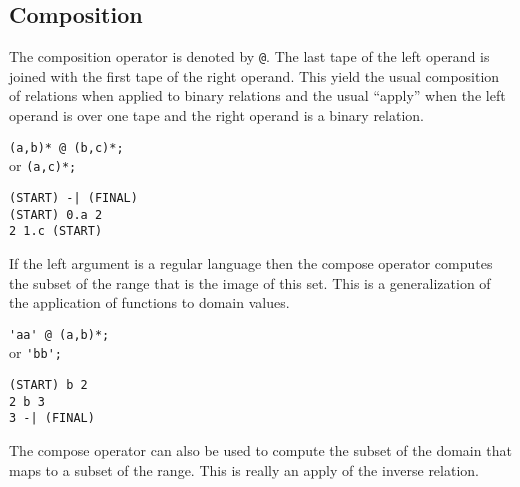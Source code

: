 \subsection{Composition}
The composition operator is denoted by \verb#@#.
The last tape of the left operand is joined with the first tape of the
right operand.
This yield the usual composition of relations when applied to binary
relations and the usual ``apply'' when the left operand is over one tape
and the right operand is a binary relation.
\begin{center}\begin{minipage}[t]{3in}\begin{minipage}[t]{3in}\begin{tabbing}
\qquad \= \verb#(a,b)* @ (b,c)*;#\\
or \> \verb#(a,c)*;#
\end{tabbing}\end{minipage}\end{minipage}
\begin{minipage}[t]{1.6in}\begin{verbatim}
(START) -| (FINAL)
(START) 0.a 2
2 1.c (START)
\end{verbatim}\end{minipage}\end{center}
If the left argument is a regular language then the compose operator
computes the subset of the range that is the image of this set.
This is a generalization of the application of functions to domain values.
\begin{center}\begin{minipage}[t]{3in}\begin{minipage}[t]{3in}\begin{tabbing}
\qquad \= \verb#'aa' @ (a,b)*;#\\
or \> \verb#'bb';#
\end{tabbing}\end{minipage}\end{minipage}
\begin{minipage}[t]{1.6in}\begin{verbatim}
(START) b 2
2 b 3
3 -| (FINAL)
\end{verbatim}\end{minipage}\end{center}
The compose operator can also be used to compute the subset of the domain
that maps to a subset of the range.
This is really an apply of the inverse relation.
